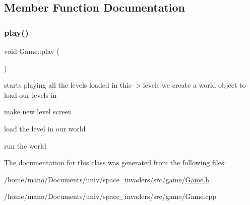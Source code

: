 \subsection{Member Function Documentation}
\mbox{\label{classGame_aa333825d0bca80e91e53c7e23f053405}} 
\subsubsection{\texorpdfstring{play()}{play()}}
{\footnotesize\ttfamily void Game\+::play (\begin{DoxyParamCaption}{ }\end{DoxyParamCaption})}

starts playing all the levels loaded in this-\/$>$levels we create a world object to load our levels in

make new level screen

load the level in our world

run the world 

The documentation for this class was generated from the following files\+:\begin{DoxyCompactItemize}
\item 
/home/mano/\+Documents/univ/space\+\_\+invaders/src/game/\hyperlink{Game_8h}{Game.\+h}\item 
/home/mano/\+Documents/univ/space\+\_\+invaders/src/game/Game.\+cpp\end{DoxyCompactItemize}
